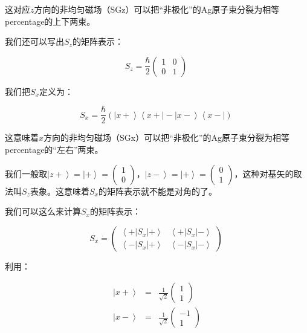 这对应$z$方向的非均匀磁场（SGz）可以把“非极化”的Ag原子束分裂为相等percentage的上下两束。

我们还可以写出$S_z$的矩阵表示：

\begin{equation}
S_z =  \frac{\hbar}{2} \left( \begin{array}{ccc}  1 & 0 \\ 0 & 1   \end{array}  \right)~
\end{equation}

我们把$S_x$定义为：

\begin{equation}
S_x = \frac{\hbar}{2} \left( \left| x+ \right\rangle \left\langle x+ \right| - \left| x- \right\rangle \left\langle x- \right| \right)~
\end{equation}

这意味着$x$方向的非均匀磁场（SGx）可以把“非极化”的Ag原子束分裂为相等percentage的“左右”两束。

我们一般取$\left| z+ \right\rangle = \left| + \right\rangle = \left( \begin{array}{ccc} 1 \\ 0 \end{array} \right)  $，$\left| z- \right\rangle = \left| + \right\rangle = \left( \begin{array}{ccc} 0 \\ 1 \end{array} \right)$，这种对基矢的取法叫$S_z$表象。这意味着$S_x$的矩阵表示就不能是对角的了。

我们可以这么来计算$S_x$的矩阵表示：

\begin{equation}
S_x \dot = \left( \begin{array}{ccc}  \left\langle + \right| S_x \left| + \right\rangle  &  \left\langle + \right| S_x \left| - \right\rangle \\   \left\langle - \right| S_x \left| + \right\rangle  &   \left\langle - \right| S_x \left| - \right\rangle  \end{array} \right) ~
\end{equation}

利用：

\begin{eqnarray}
\left| x+ \right\rangle  & = & \frac{1}{\sqrt{2}} \left(  \begin{array}{ccc} 1 \\ 1  \end{array} \right) \\
\left| x- \right\rangle & = &  \frac{1}{\sqrt{2}} \left(  \begin{array}{ccc} -1 \\ 1  \end{array} \right)
\end{eqnarray}

